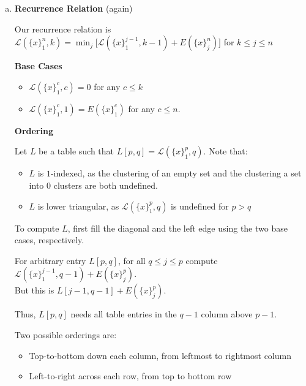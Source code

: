 \documentclass[10pt]{article}
\newcommand{\Ell}{\mathcal{L}}
\begin{document}
\begin{solution}
\begin{enumerate}[(a)]
{        }
        \item {
            \textbf{Recurrence Relation} (again)

            Our recurrence relation is 
            $\Ell(\{x\}_1^n, k) = \min_j \Bigr [ \Ell(\{x\}_1^{j-1}, k-1) + E(\{x\}_j^n) \Bigr ]$
            for $k \leq j \leq n$

            \textbf{Base Cases}

            \begin{itemize}
                \item $\Ell(\{x\}_1^c, c) = 0$ for any $c \leq k$
                \item $\Ell(\{x\}_1^c, 1) = E(\{x\}_1^c)$ for any $c \leq n$. 
            \end{itemize}

            \textbf{Ordering}

            Let $L$ be a table such that $L[p, q] = \Ell(\{x\}_1^p, q)$. 
            Note that:
            \begin{itemize}
                \item 
                $L$ is $1$-indexed, as the clustering of an empty set and 
                the clustering a set into $0$ clusters are both undefined. 
                \item 
                $L$ is lower triangular, as $\Ell(\{x\}_1^p, q)$ is undefined 
                for $p > q$
            \end{itemize}

            To compute $L$, first fill the diagonal and the left edge using the 
            two base cases, respectively. 

            For arbitrary entry $L[p, q]$, for all $q \leq j \leq p$ compute
            $\Ell(\{x\}_1^{j-1}, q-1) + E(\{x\}_j^p)$. \\
            But this is $L[j-1, q-1] + E(\{x\}_j^p)$. 

            Thus, $L[p, q]$ needs all table entries in the $q-1$ column above 
            $p-1$. 

            Two possible orderings are:
            \begin{itemize}
                \item Top-to-bottom down each column, from leftmost to rightmost column
                \item Left-to-right across each row, from top to bottom row
            \end{itemize}

}
\end{enumerate}
\end{solution}
\end{document}

